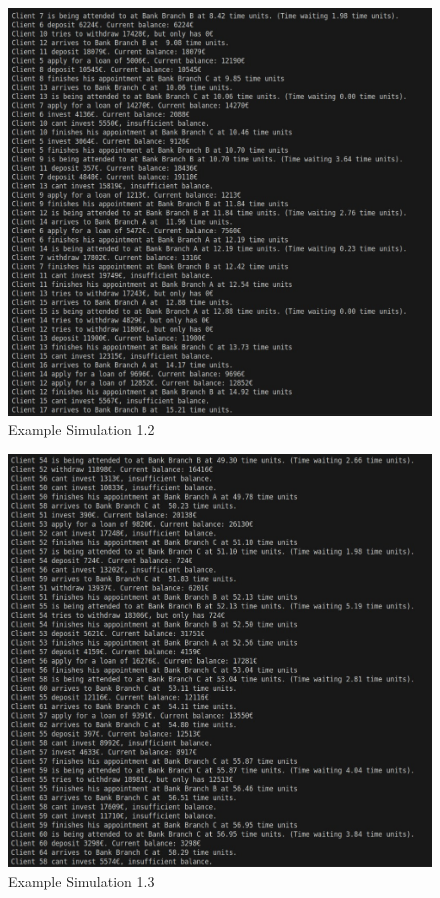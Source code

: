 \documentclass[titlepage, 12pt]{article}
\begin{document}
\begin{figure} [h]
    \centering
    \includegraphics[scale=0.6]{Screenshots/Example Simulation 1.2.jpeg}
    \caption{Example Simulation 1.2}
    \label{fig:Example Simulation 1.2}
\end{figure}

\begin{figure} [h]
    \centering
    \includegraphics[scale=0.6]{Screenshots/Example Simulation 1.3.jpeg}
    \caption{Example Simulation 1.3}
    \label{fig:Example Simulation 1.3}
\end{figure}
\end{document}
